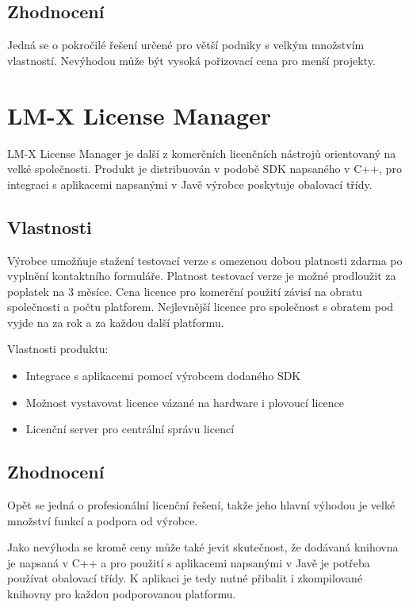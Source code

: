 \subsection*{Zhodnocení}
Jedná se o pokročilé řešení určené pro větší podniky s velkým množstvím
vlastností. Nevýhodou může být vysoká pořizovací cena pro menší projekty.

\section{LM-X License Manager}
LM-X License Manager\cite{lm-x} je další z komerčních licenčních nástrojů
orientovaný na velké společnosti. Produkt je distribuován v podobě \gls{SDK}
napsaného v C++, pro integraci s aplikacemi napsanými v Javě výrobce poskytuje obalovací
třídy.

\subsection*{Vlastnosti}
Výrobce umožňuje stažení testovací verze s omezenou dobou platnosti zdarma po
vyplnění kontaktního formuláře. Platnost testovací verze je možné prodloužit za
poplatek  na 3 měsíce. Cena licence pro komerční použití závisí na
obratu společnosti a počtu platforem. Nejlevnější licence pro společnost s
obratem pod  vyjde na  za rok a  za každou další
platformu.

Vlastnosti produktu:

\begin{itemize}
  \item Integrace s aplikacemi pomocí výrobcem dodaného \gls{SDK}
  \item Možnost vystavovat licence vázané na hardware i plovoucí licence
  \item Licenční server pro centrální správu licencí 
\end{itemize}

\subsection*{Zhodnocení}
Opět se jedná o profesionální licenční řešení, takže jeho hlavní výhodou je
velké množství funkcí a podpora od výrobce.

Jako nevýhoda se kromě ceny může také jevit skutečnost, že dodávaná knihovna je
napsaná v C++ a pro použití s aplikacemi napsanými v Javě je potřeba používat
obalovací třídy. K aplikaci je tedy nutné přibalit i zkompilované knihovny pro
každou podporovanou platformu.

